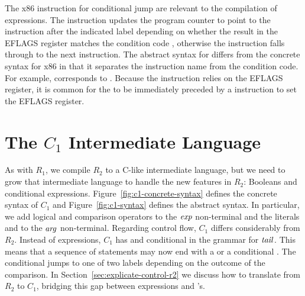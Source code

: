 \documentclass[11pt]{book}
\begin{document}
The x86 instruction for conditional jump are relevant to the
compilation of  expressions.  The  instruction
updates the program counter to point to the instruction after the
indicated label depending on whether the result in the EFLAGS register
matches the condition code , otherwise the 
instruction falls through to the next instruction.  The abstract
syntax for  differs from the concrete syntax for x86 in
that it separates the instruction name from the condition code. For
example,  corresponds to .  Because
the  instruction relies on the EFLAGS register, it is
common for the  to be immediately preceded by a 
instruction to set the EFLAGS register.


\section{The $C_1$ Intermediate Language}
\label{sec:c1}

As with $R_1$, we compile $R_2$ to a C-like intermediate language, but
we need to grow that intermediate language to handle the new features
in $R_2$: Booleans and conditional expressions.
Figure~\ref{fig:c1-concrete-syntax} defines the concrete syntax of
$C_1$ and Figure~\ref{fig:c1-syntax} defines the abstract syntax.  In
particular, we add logical and comparison operators to the $\mathit{exp}$
non-terminal and the literals  and  to the $\mathit{arg}$
non-terminal.  Regarding control flow, $C_1$ differs considerably from
$R_2$.  Instead of  expressions, $C_1$ has  and
conditional  in the grammar for $\mathit{tail}$. This means that a
sequence of statements may now end with a  or a conditional
. The conditional  jumps to one of two labels
depending on the outcome of the comparison. In
Section~\ref{sec:explicate-control-r2} we discuss how to translate
from $R_2$ to $C_1$, bridging this gap between  expressions
and 's.
\end{document}

